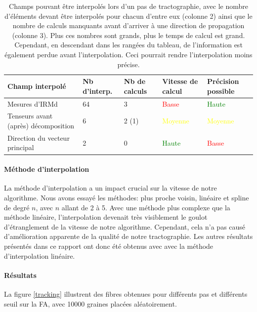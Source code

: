 \documentclass[a4paper]{article}
\begin{document}
\begin{table}
\begin{center}
\begin{tabular}{C{.3\textwidth}|C{.1\textwidth}|C{.1\textwidth}|C{.15\textwidth}|C{.15\textwidth}}
\textbf{Champ interpolé} & \textbf{Nb d'interp.} & \textbf{Nb de calculs} & \textbf{Vitesse de calcul}  & \textbf{Précision possible}\\ \hline
Mesures d'IRMd & 64 & 3 & \textcolor{red}{Basse} & \textcolor{green}{Haute} \\
Tenseurs avant (après) décomposition & 6 & 2 (1)& \textcolor{yellow}{Moyenne} & \textcolor{yellow}{Moyenne} \\
Direction du vecteur principal & 2 & 0 & \textcolor{green}{Haute} & \textcolor{red}{Basse}
\end{tabular}
\end{center}
\caption{Champs pouvant être interpolés lors d'un pas de tractographie, avec le nombre d'éléments devant être interpolés pour chacun d'entre eux (colonne 2) ainsi que le nombre de calculs manquants avant d'arriver à une direction de propagation (colonne 3). Plus ces nombres sont grands, plus le temps de calcul est grand. Cependant, en descendant dans les rangées du tableau, de l'information est également perdue avant l'interpolation. Ceci pourrait rendre l'interpolation moins précise. \label{tracto_interp}}
\end{table}

\paragraph{Méthode d'interpolation} La méthode d'interpolation a un impact crucial sur la vitesse de notre algorithme. Nous avons essayé les méthodes: plus proche voisin, linéaire et spline de degré $n$, avec $n$ allant de 2 à 5. Avec une méthode plus complexe que la méthode linéaire, l'interpolation devenait très visiblement le goulot d'étranglement de la vitesse de notre algorithme. Cependant, cela n'a pas causé d'amélioration apparente de la qualité de notre tractographie. Les autres résultats présentés dans ce rapport ont donc été obtenus avec avec la méthode d'interpolation linéaire. 

\paragraph{Résultats} La figure \ref{tracking} illustrent des fibres obtenues pour différents pas et différents seuil sur la FA, avec 10000 graines placées aléatoirement.
\end{document}
